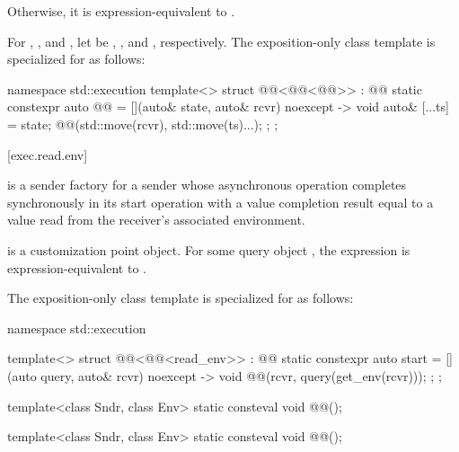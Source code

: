 Otherwise, it is expression-equivalent to
.

For , , and ,
let  be
, , and , respectively.
The exposition-only class template 
is specialized for  as follows:
\begin{codeblock}
namespace std::execution {
  template<>
  struct @@<@@<@@>> : @@ {
    static constexpr auto @@ =
      [](auto& state, auto& rcvr) noexcept -> void {
        auto& [...ts] = state;
        @@(std::move(rcvr), std::move(ts)...);
      };
  };
}
\end{codeblock}

[exec.read.env]{}

\pnum
{} is a sender factory for a sender
whose asynchronous operation completes synchronously in its start operation
with a value completion result equal to
a value read from the receiver's associated environment.

\pnum
{} is a customization point object.
For some query object ,
the expression  is expression-equivalent to
.

\pnum
The exposition-only class template 
is specialized for  as follows:
\begin{codeblock}
namespace std::execution {
  template<>
  struct @@<@@<read_env>> : @@ {
    static constexpr auto start =
      [](auto query, auto& rcvr) noexcept -> void {
        @@(rcvr, query(get_env(rcvr)));
      };
  };

  template<class Sndr, class Env>
    static consteval void @@();
}
\end{codeblock}

\begin{itemdecl}
template<class Sndr, class Env>
  static consteval void @@();
\end{itemdecl}

